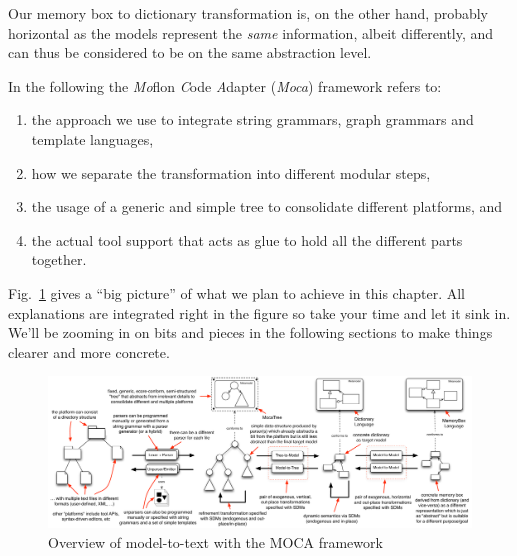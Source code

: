 Our memory box to dictionary transformation is, on the other hand, probably horizontal as the models represent the \emph{same} information, albeit differently, and can thus be considered to be on the same abstraction level.

\vspace{1.5cm}

In the following the \emph{Mo}flon \emph{C}ode \emph{A}dapter (\emph{Moca}) framework refers to:
\begin{enumerate}
 \item the approach we use to integrate string grammars, graph grammars and template languages, 
 \item how we separate the transformation into different modular steps, 
 \item the usage of a generic and simple tree to consolidate different platforms, and 
 \item the actual tool support that acts as glue to hold all the different parts together.
\end{enumerate}
 
Fig.~\ref{fig:moca-overview} gives a ``big picture'' of what we plan to achieve in this chapter.
All explanations are integrated right in the figure so take your time and let it sink in.
We'll be zooming in on bits and pieces in the following sections to make things clearer and more concrete.
\begin{figure}[htp]
\begin{center}
 \includegraphics[angle=90, height=\textheight]{pics/moca/text-to-model}
  \caption{Overview of model-to-text with the MOCA framework}
  \label{fig:moca-overview}
\end{center}
\end{figure} 

\clearpage



 
 


%

%
 

